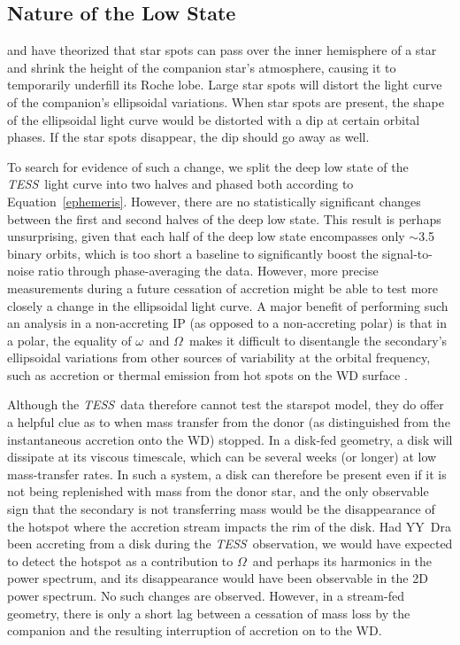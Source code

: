 \documentclass[twocolumn]{aastex63}
\newcommand{\orbit}{$\Omega$}
\newcommand{\spin}{$\omega$}
\newcommand{\TESS}{\textit{TESS}}
\begin{document}
\subsection{Nature of the Low State}

\citet{livio94} and \citet{hessman} have theorized that star spots can pass over the inner hemisphere of a star and shrink the height of the companion star's atmosphere, causing it to temporarily underfill its Roche lobe. Large star spots will distort the light curve of the companion's ellipsoidal variations. When star spots are present, the shape of the ellipsoidal light curve would be distorted with a dip at certain orbital phases. If the star spots disappear, the dip should go away as well. 

To search for evidence of such a change, we split the deep low state of the \TESS\ light curve into two halves and phased both according to Equation~\ref{ephemeris}. However, there are no statistically significant changes between the first and second halves of the deep low state. This result is perhaps unsurprising, given that each half of the deep low state encompasses only $\sim$3.5 binary orbits, which is too short a baseline to significantly boost the signal-to-noise ratio through phase-averaging the data. However, more precise measurements during a future cessation of accretion might be able to test more closely a change in the ellipsoidal light curve. A major benefit of performing such an analysis in a non-accreting IP (as opposed to a non-accreting polar) is that in a polar, the equality of \spin\ and \orbit\ makes it difficult to disentangle the secondary's ellipsoidal variations from other sources of variability at the orbital frequency, such as accretion or thermal emission from hot spots on the WD surface \citep[e.g., as observed for the low-state polar LSQ1725-64;][]{fuchs}.

Although the \TESS\ data therefore cannot test the starspot model, they do offer a helpful clue as to when mass transfer from the donor (as distinguished from the instantaneous accretion onto the WD) stopped. In a disk-fed geometry, a disk will dissipate at its viscous timescale, which can be several weeks (or longer) at low mass-transfer rates. In such a system, a disk can therefore be present even if it is not being replenished with mass from the donor star, and the only observable sign that the secondary is not transferring mass would be the disappearance of the hotspot where the accretion stream impacts the rim of the disk. Had YY~Dra been accreting from a disk during the \TESS\ observation, we would have expected to detect the hotspot as a contribution to \orbit\ and perhaps its harmonics in the power spectrum, and its disappearance would have been observable in the 2D power spectrum. No such changes are observed. However, in a stream-fed geometry, there is only a short lag between a cessation of mass loss by the companion and the resulting interruption of accretion on to the WD. 
\end{document}

